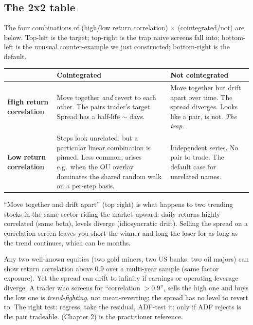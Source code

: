 \subsection{The 2x2 table}
\label{subsec:ch10_2x2}

The four combinations of (high/low return correlation) $\times$
(cointegrated/not) are below. Top-left is the target; top-right is
the trap naive screens fall into; bottom-left is the unusual
counter-example we just constructed; bottom-right is the default.

\begin{center}
\renewcommand{\arraystretch}{1.4}
\begin{tabular}{p{3.4cm} p{4.6cm} p{4.6cm}}
\toprule
                           & \textbf{Cointegrated}
                           & \textbf{Not cointegrated} \\
\midrule
\textbf{High return correlation}
  & Move together \emph{and} revert to each other. The pairs
    trader's target. Spread has a half-life $\sim$ days.
  & Move together but drift apart over time. The spread
    diverges. Looks like a pair, is not. \emph{The trap.} \\
\textbf{Low return correlation}
  & Steps look unrelated, but a particular linear combination is
    pinned. Less common; arises e.g.\ when the OU overlay
    dominates the shared random walk on a per-step basis.
  & Independent series. No pair to trade. The default
    case for unrelated names. \\
\bottomrule
\end{tabular}
\end{center}

``Move together and drift apart'' (top right) is what happens to
two trending stocks in the same sector riding the market upward:
daily returns highly correlated (same beta), levels diverge
(idiosyncratic drift). Selling the spread on a correlation screen
leaves you short the winner and long the loser for as long as the
trend continues, which can be months.

\begin{pitfallbox}
Any two well-known equities (two gold miners, two US banks,
two oil majors) can show return correlation above $0.9$ over
a multi-year sample (same factor exposure). Yet the spread can
drift to infinity if earnings or operating leverage diverge. A
trader who screens for ``correlation $> 0.9$'', sells the high one
and buys the low one is \emph{trend-fighting}, not mean-reverting;
the spread has no level to revert to. The right test: regress,
take the residual, ADF-test it; only if ADF rejects is the pair
tradeable. \citeChan{} (Chapter 2) is the practitioner reference.
\end{pitfallbox}

